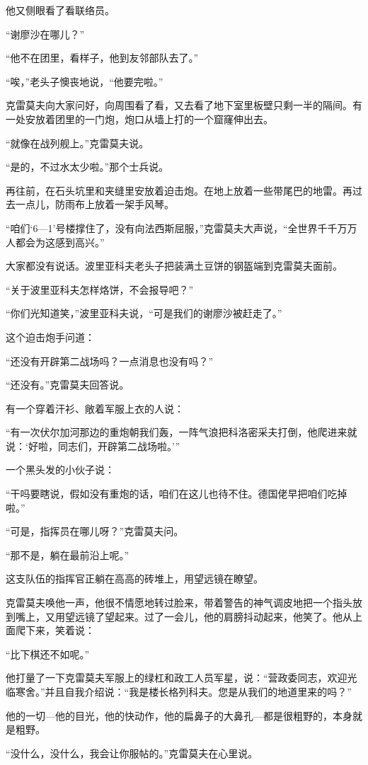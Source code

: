 他又侧眼看了看联络员。

“谢廖沙在哪儿？”

“他不在团里，看样子，他到友邻部队去了。”

“唉，”老头子懊丧地说，“他要完啦。”

克雷莫夫向大家问好，向周围看了看，又去看了地下室里板壁只剩一半的隔间。有一处安放着团里的一门炮，炮口从墙上打的一个窟窿伸出去。

“就像在战列舰上。”克雷莫夫说。

“是的，不过水太少啦。”那个士兵说。

再往前，在石头坑里和夹缝里安放着迫击炮。在地上放着一些带尾巴的地雷。再过去一点儿，防雨布上放着一架手风琴。

“咱们‘6—1’号楼撑住了，没有向法西斯屈服，”克雷莫夫大声说，“全世界千千万万人都会为这感到高兴。”

大家都没有说话。波里亚科夫老头子把装满土豆饼的钢盔端到克雷莫夫面前。

“关于波里亚科夫怎样烙饼，不会报导吧？”

“你们光知道笑，”波里亚科夫说，“可是我们的谢廖沙被赶走了。”

这个迫击炮手问道：

“还没有开辟第二战场吗？一点消息也没有吗？”

“还没有。”克雷莫夫回答说。

有一个穿着汗衫、敞着军服上衣的人说：

“有一次伏尔加河那边的重炮朝我们轰，一阵气浪把科洛密采夫打倒，他爬进来就说：‘好啦，同志们，开辟第二战场啦。’”

一个黑头发的小伙子说：

“干吗要瞎说，假如没有重炮的话，咱们在这儿也待不住。德国佬早把咱们吃掉啦。”

“可是，指挥员在哪儿呀？”克雷莫夫问。

“那不是，躺在最前沿上呢。”

这支队伍的指挥官正躺在高高的砖堆上，用望远镜在瞭望。

克雷莫夫唤他一声，他很不情愿地转过脸来，带着警告的神气调皮地把一个指头放到嘴上，又用望远镜了望起来。过了一会儿，他的肩膀抖动起来，他笑了。他从上面爬下来，笑着说：

“比下棋还不如呢。”

他打量了一下克雷莫夫军服上的绿杠和政工人员军星，说：“营政委同志，欢迎光临寒舍。”并且自我介绍说：“我是楼长格列科夫。您是从我们的地道里来的吗？”

他的一切—他的目光，他的快动作，他的扁鼻子的大鼻孔—都是很粗野的，本身就是粗野。

“没什么，没什么，我会让你服帖的。”克雷莫夫在心里说。

